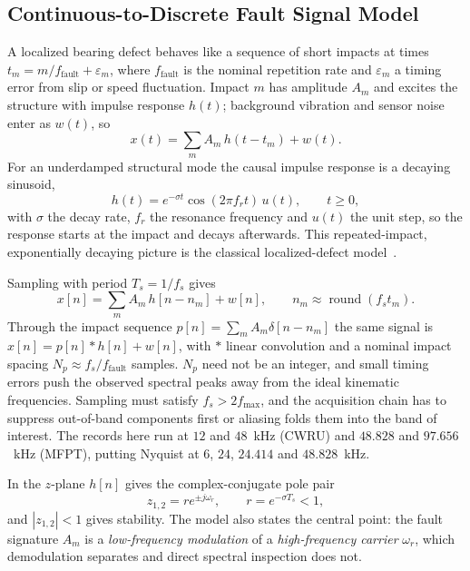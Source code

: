 \subsection{Continuous-to-Discrete Fault Signal Model}
A localized bearing defect behaves like a sequence of short impacts at times
$t_m = m/f_{\text{fault}} + \varepsilon_m$, where $f_{\text{fault}}$ is the
nominal repetition rate and $\varepsilon_m$ a timing error from slip or speed
fluctuation. Impact $m$ has amplitude $A_m$ and excites the structure with
impulse response $h(t)$; background vibration and sensor noise enter as
$w(t)$, so
\begin{equation}
  x(t) = \sum_{m} A_m\, h(t-t_m) + w(t).
  \label{eq:ctmodel}
\end{equation}
For an underdamped structural mode the causal impulse response is a decaying
sinusoid,
\begin{equation}
  h(t) = e^{-\sigma t}\cos(2\pi f_r t)\,u(t), \qquad t\geq 0,
  \label{eq:ctir}
\end{equation}
with $\sigma$ the decay rate, $f_r$ the resonance frequency and $u(t)$ the unit
step, so the response starts at the impact and decays afterwards. This
repeated-impact, exponentially decaying picture is the classical
localized-defect model~\cite{mcfadden1984}.

Sampling with period $T_s=1/f_s$ gives
\begin{equation}
  x[n] = \sum_m A_m\, h[n-n_m] + w[n], \qquad
  n_m \approx \operatorname{round}(f_s t_m).
  \label{eq:model}
\end{equation}
Through the impact sequence $p[n]=\sum_m A_m\delta[n-n_m]$ the same signal is
$x[n]=p[n]*h[n]+w[n]$, with $*$ linear convolution and a nominal impact spacing
$N_p\approx f_s/f_{\text{fault}}$ samples. $N_p$ need not be an integer, and
small timing errors push the observed spectral peaks away from the ideal
kinematic frequencies. Sampling must satisfy $f_s>2f_{\max}$, and the
acquisition chain has to suppress out-of-band components first or aliasing
folds them into the band of interest. The records here run at $12$ and
$48$~kHz (CWRU) and $48.828$ and $97.656$~kHz (MFPT), putting Nyquist at $6$,
$24$, $24.414$ and $48.828$~kHz.

In the $z$-plane $h[n]$ gives the complex-conjugate pole pair
\begin{equation}
  z_{1,2} = r e^{\pm j\omega_r}, \qquad r = e^{-\sigma T_s} < 1,
  \label{eq:poles}
\end{equation}
and $|z_{1,2}|<1$ gives stability. The model also states the central point: the
fault signature $A_m$ is a \emph{low-frequency modulation} of a
\emph{high-frequency carrier} $\omega_r$, which demodulation separates and
direct spectral inspection does not.
